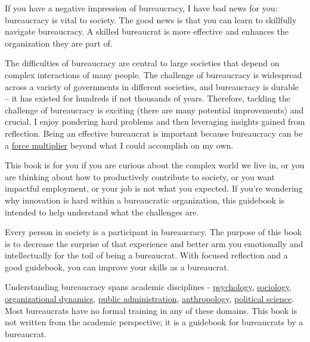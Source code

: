 

If you have a negative impression of bureaucracy, I have bad news for you: bureaucracy is vital to society. The good news is that you can learn to skillfully navigate bureaucracy. A skilled bureaucrat is more effective and enhances the organization they are part of.

The difficulties of bureaucracy are central  to large societies that depend on complex interactions of many people. The challenge of bureaucracy is widespread across a variety of governments in different societies, and bureaucracy is durable -- it has existed for hundreds if not thousands of years. Therefore, tackling the challenge of bureaucracy is exciting (there are many potential improvements) and crucial. I enjoy pondering hard problems and then leveraging insights gained from reflection. Being an effective bureaucrat is important because bureaucracy can be a \href{https://en.wikipedia.org/wiki/Force_multiplication}{force multiplier} beyond what I could accomplish on my own.

This book is for you if you are curious about the complex world we live in, or you are thinking about how to productively contribute to society, or you want impactful employment, or your job is not what you expected. If you're wondering why innovation is hard within a bureaucratic organization, this guidebook is intended to help understand what the challenges are.


Every person in society is a participant in bureaucracy. The purpose of this book is to decrease the surprise of that experience and better arm you emotionally and intellectually for the toil of being a bureaucrat. With focused reflection and a good guidebook, you can improve your skills as a bureaucrat. 

Understanding bureaucracy spans academic disciplines - \href{https://en.wikipedia.org/wiki/Psychology}{psychology}, \href{https://en.wikipedia.org/wiki/Sociology}{sociology}, \href{https://en.wikipedia.org/wiki/Organizational_behavior}{organizational dynamics}, \href{https://en.wikipedia.org/wiki/Public_administration}{public administration}, \href{https://en.wikipedia.org/wiki/Anthropology}{anthropology}, \href{https://en.wikipedia.org/wiki/Political_science}{political science}. Most bureaucrats have no formal training in any of these domains. This book is not written from the academic perspective; it is a guidebook for bureaucrats by a bureaucrat. 

